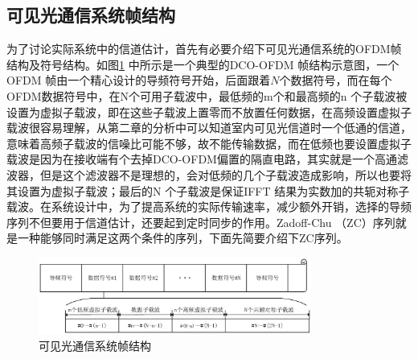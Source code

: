 \subsection{可见光通信系统帧结构}
为了讨论实际系统中的信道估计，首先有必要介绍下可见光通信系统的OFDM帧结构及符号结构。如图\ref{fig:FrameStructure} 中所示是一个典型的DCO-OFDM 帧结构示意图，一个OFDM 帧由一个精心设计的导频符号开始，后面跟着$N$个数据符号，而在每个OFDM数据符号中，在N个可用子载波中，最低频的m个和最高频的n 个子载波被设置为虚拟子载波，即在这些子载波上置零而不放置任何数据，在高频设置虚拟子载波很容易理解，从第二章的分析中可以知道室内可见光信道时一个低通的信道，意味着高频子载波的信噪比可能不够，故不能传输数据，而在低频也要设置虚拟子载波是因为在接收端有个去掉DCO-OFDM偏置的隔直电路，其实就是一个高通滤波器，但是这个滤波器不是理想的，会对低频的几个子载波造成影响，所以也要将其设置为虚拟子载波；最后的N 个子载波是保证IFFT 结果为实数加的共轭对称子载波。在系统设计中，为了提高系统的实际传输速率，减少额外开销，选择的导频序列不但要用于信道估计，还要起到定时同步的作用。Zadoff-Chu （ZC）序列就是一种能够同时满足这两个条件的序列，下面先简要介绍下ZC序列。
\begin{figure}[htbp]
    \centering
    \includegraphics[width=0.8\textwidth]{figures/chapter-3/FrameStructure.eps}
    \caption{可见光通信系统帧结构}
    \label{fig:FrameStructure}
\end{figure}

